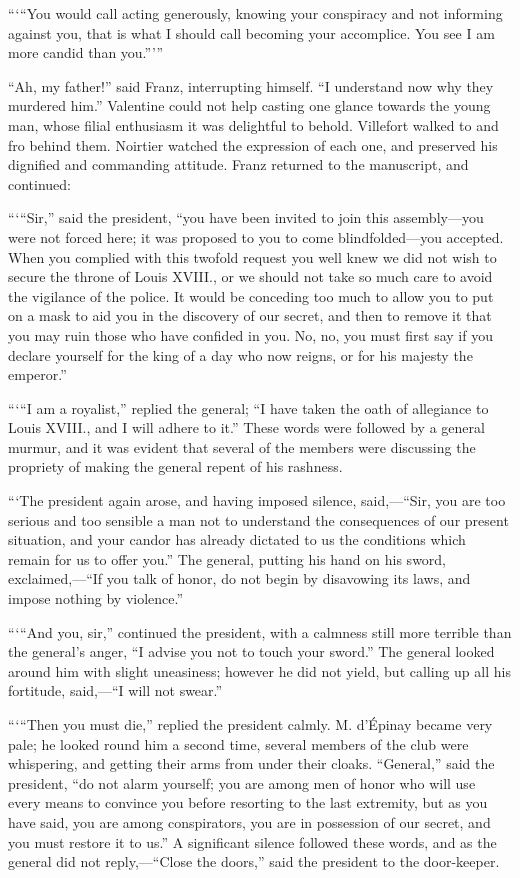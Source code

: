 “‘“You would call acting generously, knowing your conspiracy and not
informing against you, that is what I should call becoming your
accomplice. You see I am more candid than you.”’”

“Ah, my father!” said Franz, interrupting himself. “I understand now
why they murdered him.” Valentine could not help casting one glance
towards the young man, whose filial enthusiasm it was delightful to
behold. Villefort walked to and fro behind them. Noirtier watched the
expression of each one, and preserved his dignified and commanding
attitude. Franz returned to the manuscript, and continued:

“‘“Sir,” said the president, “you have been invited to join this
assembly—you were not forced here; it was proposed to you to come
blindfolded—you accepted. When you complied with this twofold request
you well knew we did not wish to secure the throne of Louis XVIII., or
we should not take so much care to avoid the vigilance of the police.
It would be conceding too much to allow you to put on a mask to aid you
in the discovery of our secret, and then to remove it that you may ruin
those who have confided in you. No, no, you must first say if you
declare yourself for the king of a day who now reigns, or for his
majesty the emperor.”

“‘“I am a royalist,” replied the general; “I have taken the oath of
allegiance to Louis XVIII., and I will adhere to it.” These words were
followed by a general murmur, and it was evident that several of the
members were discussing the propriety of making the general repent of
his rashness.

“‘The president again arose, and having imposed silence, said,—“Sir,
you are too serious and too sensible a man not to understand the
consequences of our present situation, and your candor has already
dictated to us the conditions which remain for us to offer you.” The
general, putting his hand on his sword, exclaimed,—“If you talk of
honor, do not begin by disavowing its laws, and impose nothing by
violence.”

“‘“And you, sir,” continued the president, with a calmness still more
terrible than the general’s anger, “I advise you not to touch your
sword.” The general looked around him with slight uneasiness; however
he did not yield, but calling up all his fortitude, said,—“I will not
swear.”

“‘“Then you must die,” replied the president calmly. M. d’Épinay became
very pale; he looked round him a second time, several members of the
club were whispering, and getting their arms from under their cloaks.
“General,” said the president, “do not alarm yourself; you are among
men of honor who will use every means to convince you before resorting
to the last extremity, but as you have said, you are among
conspirators, you are in possession of our secret, and you must restore
it to us.” A significant silence followed these words, and as the
general did not reply,—“Close the doors,” said the president to the
door-keeper.

